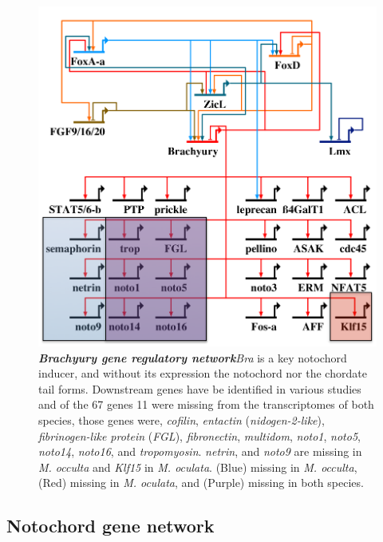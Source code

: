 \begin{figure}[tbp]
\centering
\includegraphics[scale=0.55]{figures/bra_grn.pdf}
\caption{\textbf{\textit{Brachyury gene regulatory network}}\textit{Bra} is a key notochord inducer, and without its expression the notochord nor the chordate tail forms. Downstream genes have be identified in various studies and of the 67 genes 11 were missing from the transcriptomes of both species, those genes were, \textit{cofilin}, \textit{entactin} (\textit{nidogen-2-like}), \textit{fibrinogen-like protein} (\textit{FGL}), \textit{fibronectin}, \textit{multidom}, \textit{noto1}, \textit{noto5}, \textit{noto14}, \textit{noto16}, and \textit{tropomyosin}. \textit{netrin}, and \textit{noto9} are missing in \textit{M. occulta} and \textit{Klf15} in \textit{M. oculata}. (Blue) missing in \textit{M. occulta}, (Red) missing in \textit{M. oculata}, and (Purple) missing in both species.}
\label{fig:bra_grn}
\end{figure}
\subsection{Notochord gene network}

